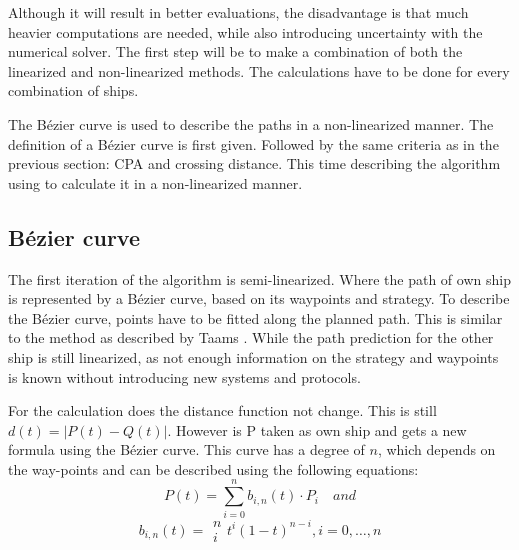Although it will result in better evaluations, the disadvantage is that much heavier computations are needed, while also introducing uncertainty with the numerical solver. 
The first step will be to make a combination of both the linearized and non-linearized methods. The calculations have to be done for every combination of ships.

The Bézier curve is used to describe the paths in a non-linearized manner. The definition of a Bézier curve is first given. Followed by the same criteria as in the previous section: \acf{CPA} and crossing distance. This time describing the algorithm using to calculate it in a non-linearized manner.

\subsection{Bézier curve}
The first iteration of the algorithm is semi-linearized. Where the path of own ship is represented by a Bézier curve, based on its waypoints and strategy. To describe the Bézier curve, points have to be fitted along the planned path. This is similar to the method as described by Taams \cite{Taams2018}. While the path prediction for the other ship is still linearized, as not enough information on the strategy and waypoints is known without introducing new systems and protocols.

For the calculation does the distance function not change. This is still $
d(t) = |P(t) - Q(t)|$. However is P taken as own ship and gets a new formula using the Bézier curve. This curve has a degree of $n$, which depends on the way-points and can be described using the following equations:
\begin{equation}
P(t) = \sum\limits_{i=0}^n b_{i,n}(t) \cdot P_i \quad and
\end{equation}
\begin{equation}
b_{i,n}(t) = \begin{array}{c} n \\ i \end{array} t^i(1-t)^{n-i}, i = 0,\dots,n
\end{equation}


